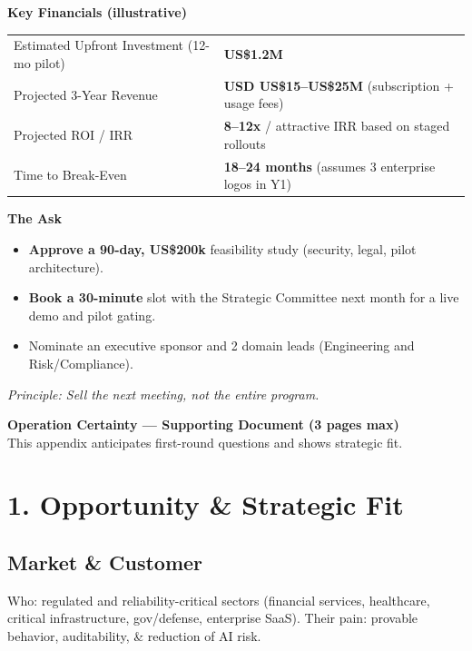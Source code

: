 \documentclass[11pt]{article}
\newcommand{\headline}[1]{\noindent\colorbox[HTML]{F2F4F7}{\parbox{\dimexpr\linewidth-2\fboxsep\relax}{\vspace{2pt}\textbf{#1}\vspace{2pt}}}}
\begin{document}
\vspace{0.25em}
\headline{Key Financials (illustrative)}\vspace{0.25em}
\begin{tabularx}{\linewidth}{@{}lX@{}}
\toprule
Estimated Upfront Investment (12-mo pilot) & \textbf{US\$1.2M} \\
Projected 3-Year Revenue & \textbf{USD US\$15--US\$25M} (subscription + usage fees) \\
Projected ROI / IRR & \textbf{8--12x} / attractive IRR based on staged rollouts \\
Time to Break-Even & \textbf{18--24 months} (assumes 3 enterprise logos in Y1) \\
\bottomrule
\end{tabularx}

\vspace{0.25em}
\headline{The Ask}\vspace{0.25em}
\begin{itemize}
  \item \textbf{Approve a 90-day, US\$200k} feasibility study (security, legal, pilot architecture).\\
  \item \textbf{Book a 30-minute} slot with the Strategic Committee next month for a live demo and pilot gating.\\
  \item Nominate an executive sponsor and 2 domain leads (Engineering and Risk/Compliance).
\end{itemize}

\vspace{0.25em}
\noindent\textit{Principle: Sell the next meeting, not the entire program.}\par

\newpage

\begin{center}
{\Large\bfseries Operation Certainty — Supporting Document (3 pages max)}\\[2pt]
{\small This appendix anticipates first-round questions and shows strategic fit.}
\end{center}

\section*{1. Opportunity \& Strategic Fit}
\subsection*{Market \& Customer}
Who: regulated and reliability-critical sectors (financial services, healthcare, critical infrastructure, gov/defense, enterprise SaaS). Their pain: provable behavior, auditability, \& reduction of AI risk.
\end{document}
